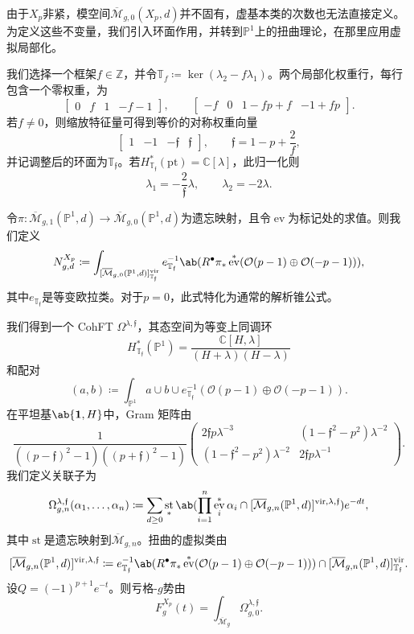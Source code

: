 \documentclass{amsart}
\theoremstyle{definition}
\theoremstyle{remark}
\theoremstyle{plain}
\theoremstyle{definition}
\theoremstyle{remark}
\newcommand{\C}{\mathbb{C}}
\newcommand{\Z}{\mathbb{Z}}
\renewcommand{\P}{\mathbb{P}}
\newcommand{\Mbar}{\overline{\mathcal{M}}}
\newcommand{\mc}[1]{\mathcal{#1}}
\newcommand{\T}{\mathbb{T}}
\newcommand{\mf}[1]{\mathfrak{#1}}
\newcommand{\mr}[1]{\mathrm{#1}}
\newcommand{\1}{\mathbf{1}}
\newcommand{\2}{\mathbf{2}}
\newcommand{\3}{\mathbf{3}}
\newcommand{\vir}{\mr{vir}}
\DeclareMathOperator{\ev}{ev}
\DeclareMathOperator{\st}{st}
\begin{document}
由于\(X_p\)非紧，模空间\(\Mbar_{g,0}(X_p,d)\)并不固有，虚基本类的次数也无法直接定义。为定义这些不变量，我们引入环面作用，并转到\(\P^1\)上的扭曲理论，在那里应用虚拟局部化。

我们选择一个框架\(f \in \Z\)，并令\(\T_f \coloneqq \ker(\lambda_2 - f\lambda_1)\)。两个局部化权重行，每行包含一个零权重，为
\[ \begin{bmatrix} 0 & f & 1 & -f-1 \end{bmatrix}, \qquad \begin{bmatrix} -f & 0 & 1-fp+f & -1+fp \end{bmatrix}. \]
若\(f \neq 0\)，则缩放特征量可得到等价的对称权重向量
\[ \begin{bmatrix} 1 & -1 & -\mf{f} & \mf{f} \end{bmatrix}, \qquad \mf{f} = 1-p+\frac{2}{f}, \]
并记调整后的环面为\(\T_{\mf{f}}\)。若\(H^*_{\T_{\mf{f}}}(\mr{pt}) = \C[\lambda]\)，此归一化则
\[ \lambda_1 = -\frac{2}{\mf{f}}\lambda, \qquad \lambda_2 = -2\lambda. \]

令\(\pi \colon \Mbar_{g,1}(\P^1,d) \to \Mbar_{g,0}(\P^1,d)\)为遗忘映射，且令\(\ev\)为标记处的求值。则我们定义
\[ N^{X_p}_{g,d} \coloneqq \int_{[\Mbar_{g,0}(\P^1,d)]^{\vir}_{\T_{\mf{f}}}} e_{\T_{\mf{f}}}^{-1}\ab(R^{\bullet}\pi_* \ev^*(\mc{O}(p-1)\oplus\mc{O}(-p-1))), \]
其中\(e_{\T_{\mf{f}}}\)是等变欧拉类。对于\(p=0\)，此式特化为通常的解析锥公式。

我们得到一个 CohFT \(\Omega^{\lambda,\mf{f}}\)，其态空间为等变上同调环
\[ H^*_{\T_{\mf{f}}}(\P^1) = \frac{\C[H,\lambda]}{(H+\lambda)(H-\lambda)} \]
和配对
\[ (a,b) \coloneqq \int_{\P^1} a \cup b \cup e^{-1}_{\T_{\mf{f}}}(\mc{O}(p-1)\oplus\mc{O}(-p-1)). \]
在平坦基\(\ab\{\1,H\}\)中，Gram 矩阵由
\[ \frac{1}{((p-\mf{f})^2-1)((p+\mf{f})^2-1)}\begin{pmatrix} 2\mf{f}p\lambda^{-3} & (1-\mf{f}^2-p^2)\lambda^{-2} \\ (1-\mf{f}^2-p^2)\lambda^{-2} & 2\mf{f}p\lambda^{-1} \end{pmatrix}. \]
我们定义关联子为
\[ \Omega^{\lambda,\mf{f}}_{g,n}(\alpha_1,\ldots,\alpha_n) \coloneqq \sum_{d\geq0}\st_*\ab(\prod_{i=1}^n \ev_i^*\alpha_i \cap [\Mbar_{g,n}(\P^1,d)]^{\vir,\lambda,\mf{f}})e^{-dt}, \]
其中\(\st\)是遗忘映射到\(\Mbar_{g,n}\)。扭曲的虚拟类由
\[ [\Mbar_{g,n}(\P^1,d)]^{\vir,\lambda,\mf{f}} \coloneqq e^{-1}_{\T_{\mf{f}}}\ab(R^{\bullet}\pi_*\ev^*(\mc{O}(p-1)\oplus\mc{O}(-p-1))) \cap [\Mbar_{g,n}(\P^1,d)]^{\vir}_{\T_{\mf{f}}}. \]
设\(Q = (-1)^{p+1}e^{-t}\)。则亏格-\(g\)势由
\[ F^{X_p}_g(t) = \int_{\Mbar_g} \Omega^{\lambda,\mf{f}}_{g,0}. \]
\end{document}
